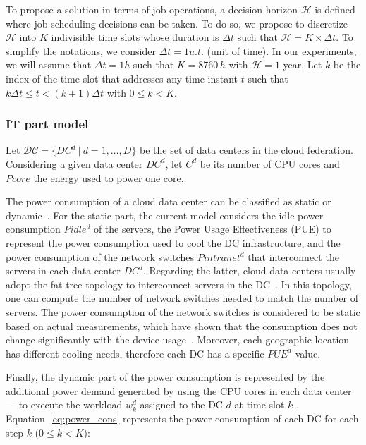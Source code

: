 To propose a solution in terms of job operations, a decision horizon $\mathcal{H}$ is defined where job scheduling decisions can be taken. To do so, we propose to discretize $\mathcal{H}$ into $K$ indivisible time slots whose duration is $\Delta t$ such that $\mathcal{H} = K\times\Delta t$. To simplify the notations, we consider $\Delta t = 1 u.t.$ (unit of time). In our experiments, we will assume that $\Delta t = 1h$ such that $K = 8760\,h$ with $\mathcal{H} = 1$ year. 
Let $k$ be the index of the time slot that addresses any time instant $t$ such that $k\Delta t\leq t < (k+1)\Delta t$ with $0\leq k< K$. 


\subsubsection{IT part model} 

Let $\mathcal{DC} = \{DC^d \ | \ d=1, \ldots, D\}$ be the set of data centers in the cloud federation. Considering a given data center $DC^d$, let $C^d$ be its number of CPU cores and $Pcore$ the energy used to power one core.


The power consumption of a cloud data center can be classified as static or dynamic~\cite{ahvar22_estimating_cloud_cons}. For the static part, the current model considers the idle power consumption $Pidle^d$ of the servers, the Power Usage Effectiveness (PUE) to represent the power consumption used to cool the DC infrastructure, and the power consumption of the network switches $Pintranet^d$ that interconnect the servers in each data center $DC^d$. Regarding the latter, cloud data centers usually adopt the fat-tree topology to interconnect servers in the DC~\cite{ahvar22_estimating_cloud_cons}. In this topology, one can compute the number of network switches needed to match the number of servers. The power consumption of the network switches is considered to be static based on actual measurements, which have shown that the consumption does not change significantly with the device usage~\cite{Hlavacs2009_energy_network_devices}. Moreover, each geographic location has different cooling needs, therefore each DC has a specific $PUE^d$ value. 

Finally, the dynamic part of the power consumption is represented by the additional power demand generated by using the CPU cores in each data center --- to execute the workload $ w^d_k$ assigned to the DC $d$ at time slot $k$ . Equation~\eqref{eq:power_cons} represents the power consumption of each DC for each step $k$ ($0\leq k<K$):

